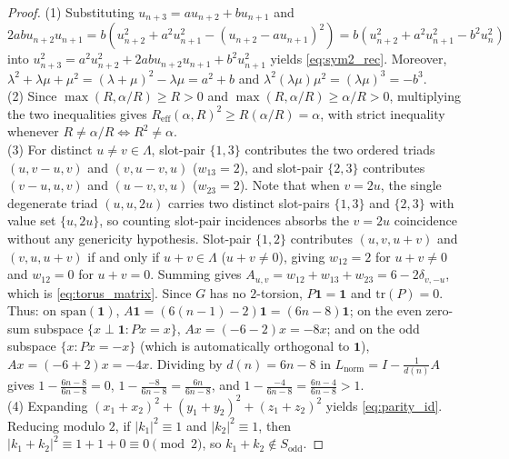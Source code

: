 \documentclass[11pt,a4paper]{article}
\theoremstyle{definition}
\theoremstyle{remark}
\begin{document}
\begin{proof}
(1) Substituting $u_{n+3} = a u_{n+2} + b u_{n+1}$ and $2a b u_{n+2} u_{n+1} = b(u_{n+2}^2 + a^2 u_{n+1}^2 - (u_{n+2} - a u_{n+1})^2) = b(u_{n+2}^2 + a^2 u_{n+1}^2 - b^2 u_n^2)$ into $u_{n+3}^2 = a^2 u_{n+2}^2 + 2ab u_{n+2} u_{n+1} + b^2 u_{n+1}^2$ yields \eqref{eq:sym2_rec}. Moreover, $\lambda^2 + \lambda\mu + \mu^2 = (\lambda+\mu)^2 - \lambda\mu = a^2 + b$ and $\lambda^2(\lambda\mu)\mu^2 = (\lambda\mu)^3 = -b^3$.\\
(2) Since $\max(R, \alpha/R) \ge R > 0$ and $\max(R, \alpha/R) \ge \alpha/R > 0$, multiplying the two inequalities gives $R_{\mathrm{eff}}(\alpha, R)^2 \ge R(\alpha/R) = \alpha$, with strict inequality whenever $R \ne \alpha/R \iff R^2 \ne \alpha$.\\
(3) For distinct $u \ne v \in \Lambda$, slot-pair $\{1,3\}$ contributes the two ordered triads $(u, v-u, v)$ and $(v, u-v, u)$ ($w_{13} = 2$), and slot-pair $\{2,3\}$ contributes $(v-u, u, v) $ and $(u-v, v, u)$ ($w_{23} = 2$). Note that when $v = 2u$, the single degenerate triad $(u, u, 2u)$ carries two distinct slot-pairs $\{1,3\}$ and $\{2,3\}$ with value set $\{u, 2u\}$, so counting slot-pair incidences absorbs the $v=2u$ coincidence without any genericity hypothesis. Slot-pair $\{1,2\}$ contributes $(u, v, u+v)$ and $(v, u, u+v)$ if and only if $u+v \in \Lambda$ ($u+v \ne 0$), giving $w_{12} = 2$ for $u+v \ne 0$ and $w_{12} = 0$ for $u+v = 0$. Summing gives $A_{u,v} = w_{12} + w_{13} + w_{23} = 6 - 2\delta_{v,-u}$, which is \eqref{eq:torus_matrix}. Since $G$ has no $2$-torsion, $P\mathbf{1} = \mathbf{1}$ and $\mathrm{tr}(P) = 0$. Thus: on $\mathrm{span}(\mathbf{1})$, $A\mathbf{1} = (6(n-1)-2)\mathbf{1} = (6n-8)\mathbf{1}$; on the even zero-sum subspace $\{x \perp \mathbf{1} : Px = x\}$, $Ax = (-6-2)x = -8x$; and on the odd subspace $\{x : Px = -x\}$ (which is automatically orthogonal to $\mathbf{1}$), $Ax = (-6+2)x = -4x$. Dividing by $d(n) = 6n-8$ in $L_{\mathrm{norm}} = I - \frac{1}{d(n)}A$ gives $1 - \frac{6n-8}{6n-8} = 0$, $1 - \frac{-8}{6n-8} = \frac{6n}{6n-8}$, and $1 - \frac{-4}{6n-8} = \frac{6n-4}{6n-8} > 1$.\\
(4) Expanding $(x_1+x_2)^2 + (y_1+y_2)^2 + (z_1+z_2)^2$ yields \eqref{eq:parity_id}. Reducing modulo $2$, if $|k_1|^2 \equiv 1$ and $|k_2|^2 \equiv 1$, then $|k_1+k_2|^2 \equiv 1 + 1 + 0 \equiv 0 \pmod 2$, so $k_1 + k_2 \notin S_{\mathrm{odd}}$.
\end{proof}
\end{document}

